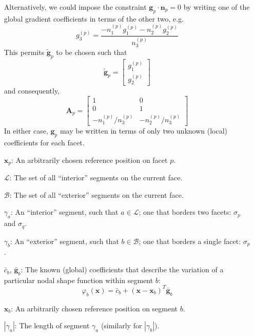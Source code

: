 \documentclass[11pt]{article} %
\begin{document}
\begin{itemize}
	Alternatively, we could impose the constraint $\mathbf{g}_p \cdot \mathbf{n}_p = 0$ by writing one of the global gradient coefficients in terms of the other two, e.g.
	\begin{equation}
		g_3^{(p)} = \frac{-n_1^{(p)} g_1^{(p)} -n_2^{(p)} g_2^{(p)}}{n_3^{(p)}}
	\end{equation}
	This permits $\tilde{\mathbf{g}}_p$ to be chosen such that
	\begin{equation}
		\tilde{\mathbf{g}}_p = \left[ \begin{array}{c} g^{(p)}_1 \\ g^{(p)}_2 \end{array} \right]
	\end{equation}
	and consequently,
	\begin{equation}
		\mathbf{A}_p = \left[ \begin{array}{cc} 1 & 0 \\ 0 & 1 \\ -n_1^{(p)}/n_3^{(p)} & -n_2^{(p)}/n_3^{(p)} \end{array} \right]
	\end{equation}
	In either case, $\mathbf{g}_p$ may be written in terms of only two unknown (local) coefficients for each facet.
	\item[$\mathbf{x}_p$:] An arbitrarily chosen reference position on facet $p$.
	\item[$\mathcal{L}$:] The set of all ``interior'' segments on the current face.
	\item[$\mathcal{B}$:] The set of all ``exterior'' segments on the current face.
	\item[$\gamma_a$:] An ``interior'' segment, such that $a \in \mathcal{L}$; one that borders two facets: $\sigma_p$ and $\sigma_q$.
	\item[$\gamma_b$:] An ``exterior'' segment, such that $b \in \mathcal{B}$; one that borders a single facet: $\sigma_p$.
	\item[$\bar{c}_b$, $\bar{\mathbf{g}}_b$:] The known (global) coefficients that describe the variation of a particular nodal shape function within segment $b$:
	\begin{equation}
		\varphi_b (\mathbf{x}) = \bar{c}_b + (\mathbf{x} - \mathbf{x}_b)^T \bar{\mathbf{g}}_b
	\end{equation}
	\item[$\mathbf{x}_b$:] An arbitrarily chosen reference position on segment $b$.
	\item[$| \gamma_a |$:] The length of segment $\gamma_a$ (similarly for $| \gamma_b |$).

\end{itemize}
\end{document}
